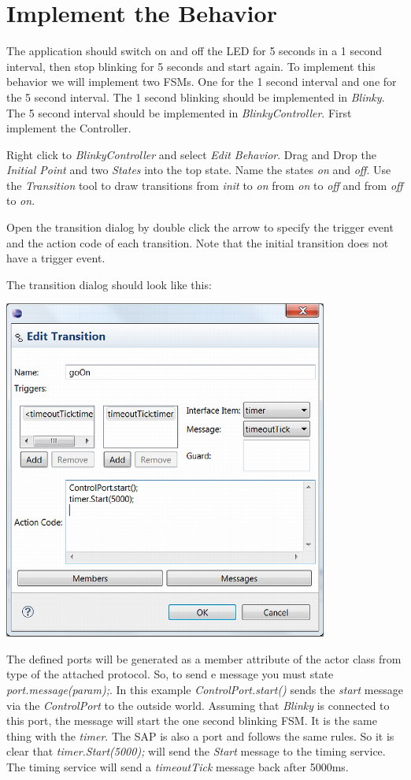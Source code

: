 \section{Implement the Behavior}

The application should switch on and off the LED for 5 seconds in a 1 second interval, then stop blinking for 5 seconds and start again. To implement this behavior we will implement two FSMs. One for the 1 second interval and one for the 5 second interval. The 1 second blinking should be implemented in \textit{Blinky}. The 5 second interval should be implemented in \textit{BlinkyController}. First implement the Controller.

Right click to \textit{BlinkyController} and select \textit{Edit Behavior}.
Drag and Drop the \textit{Initial Point} and two \textit{States} into the top state. Name the states \textit{on} and \textit{off}. 
Use the \textit{Transition} tool to draw transitions from \textit{init} to \textit{on} from \textit{on} to \textit{off} and from \textit{off} to \textit{on}.

Open the transition dialog by double click the arrow to specify the trigger event and the action code of each transition. Note that the initial transition does not have a trigger event.

The transition dialog should look like this:

\includegraphics[width=0.8\textwidth]{images/020-Blinky09.png}

The defined ports will be generated as a member attribute of the actor class from type of the attached protocol. So, to send e message you must state \textit{port.message(param);}. In this example \textit{ControlPort.start()} sends the \textit{start} message via the \textit{ControlPort} to the outside world. Assuming that \textit{Blinky} is connected to this port, the message will start the one second blinking FSM. It is the same thing with the \textit{timer}. The SAP is also a port and follows the same rules. So it is clear that \textit{timer.Start(5000);} will send the \textit{Start} message to the timing service. The timing service will send a \textit{timeoutTick} message back after 5000ms.

